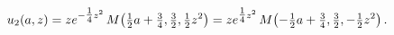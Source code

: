 \[u_{2}(a,z)=ze^{-\tfrac{1}{4}z^{2}}\mathop{M\/}\nolimits\!\left(\tfrac{1}{2}a+%
\tfrac{3}{4},\tfrac{3}{2},\tfrac{1}{2}z^{2}\right)=ze^{\tfrac{1}{4}z^{2}}%
\mathop{M\/}\nolimits\!\left(-\tfrac{1}{2}a+\tfrac{3}{4},\tfrac{3}{2},-\tfrac{%
1}{2}z^{2}\right).\]